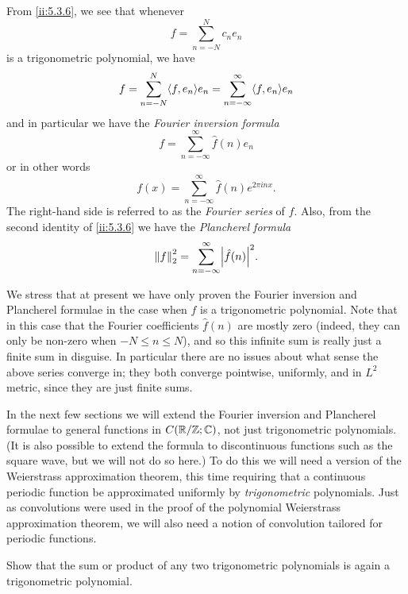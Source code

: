\begin{ac}\label{ii:ac:5.3.1}
  From \cref{ii:5.3.6}, we see that whenever
  \[
    f = \sum_{n = -N}^N c_n e_n
  \]
  is a trigonometric polynomial, we have
  \[
    f = \sum_{n = -N}^N \inner*{f, e_n} e_n = \sum_{n = -\infty}^\infty \inner*{f, e_n} e_n
  \]
  and in particular we have the \emph{Fourier inversion formula}
  \[
    f = \sum_{n = -\infty}^\infty \hat{f}(n) e_n
  \]
  or in other words
  \[
    f(x) = \sum_{n = -\infty}^\infty \hat{f}(n) e^{2 \pi i n x}.
  \]
  The right-hand side is referred to as the \emph{Fourier series} of \(f\).
  Also, from the second identity of \cref{ii:5.3.6} we have the \emph{Plancherel formula}
  \[
    \norm*{f}_2^2 = \sum_{n = -\infty}^\infty \abs{\hat{f}(n)}^2.
  \]
\end{ac}

\begin{rmk}\label{ii:5.3.8}
  We stress that at present we have only proven the Fourier inversion and Plancherel formulae in the case when \(f\) is a trigonometric polynomial.
  Note that in this case that the Fourier coefficients \(\hat{f}(n)\) are mostly zero (indeed, they can only be non-zero when \(-N \leq n \leq N\)), and so this infinite sum is really just a finite sum in disguise.
  In particular there are no issues about what sense the above series converge in;
  they both converge pointwise, uniformly, and in \(L^2\) metric, since they are just finite sums.
\end{rmk}

\begin{note}
  In the next few sections we will extend the Fourier inversion and Plancherel formulae to general functions in \(C(\mathbb{R} / \mathbb{Z} ; \mathbb{C})\), not just trigonometric polynomials.
  (It is also possible to extend the formula to discontinuous functions such as the square wave, but we will not do so here.)
  To do this we will need a version of the Weierstrass approximation theorem, this time requiring that a continuous periodic function be approximated uniformly by \emph{trigonometric} polynomials.
  Just as convolutions were used in the proof of the polynomial Weierstrass approximation theorem, we will also need a notion of convolution tailored for periodic functions.
\end{note}

\exercisesection

\begin{ex}\label{ii:ex:5.3.1}
  Show that the sum or product of any two trigonometric polynomials is again a trigonometric polynomial.
\end{ex}

